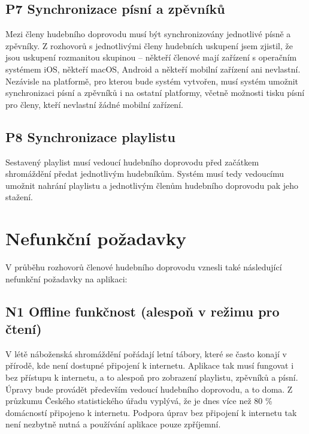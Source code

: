 \subsection{P7 Synchronizace písní a zpěvníků}
\label{synchronizace-pisni-zpevniku}

Mezi členy hudebního doprovodu musí být synchronizovány jednotlivé písně a zpěvníky. Z rozhovorů s jednotlivými členy hudebních uskupení jsem zjistil, že jsou uskupení rozmanitou skupinou -- někteří členové mají zařízení s operačním systémem iOS, někteří macOS, Android a někteří mobilní zařízení ani nevlastní. Nezávisle na platformě, pro kterou bude systém vytvořen, musí systém umožnit synchronizaci písní a zpěvníků i na ostatní platformy, včetně možnosti tisku písní pro členy, kteří nevlastní žádné mobilní zařízení.

\subsection{P8 Synchronizace playlistu}
\label{synchronizace-playlistu}

Sestavený playlist musí vedoucí hudebního doprovodu před začátkem shromáždění předat jednotlivým hudebníkům. Systém musí tedy vedoucímu umožnit nahrání playlistu a jednotlivým členům hudebního doprovodu pak jeho stažení.

\section{Nefunkční požadavky}

V průběhu rozhovorů členové hudebního doprovodu vznesli také následující nefunkční požadavky na aplikaci:

\subsection{N1 Offline funkčnost (alespoň v režimu pro čtení)}
\label{offline-funkcnost}

V létě náboženská shromáždění pořádají letní tábory, které se často konají v přírodě, kde není dostupné připojení k internetu. Aplikace tak musí fungovat i bez přístupu k internetu, a to alespoň pro zobrazení playlistu, zpěvníků a písní. Úpravy bude provádět především vedoucí hudebního doprovodu, a to doma. Z průzkumu Českého statistického úřadu vyplývá, že je dnes více než 80 \% domácností připojeno k internetu. \cite{internet-usage-czechia} Podpora úprav bez připojení k internetu tak není nezbytně nutná a používání aplikace pouze zpříjemní.


